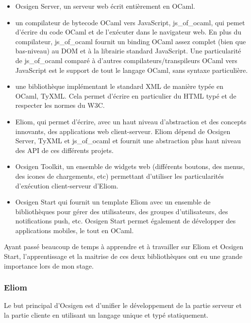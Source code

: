 \begin{itemize}
  \item Ocsigen Server\cite{ocsigen-server-github}, un serveur web écrit entièrement en OCaml.
  \item un compilateur de bytecode OCaml vers JavaScript, js\_of\_ocaml\cite{ocsigen-js-of-ocaml-github}, qui
    pemet d'écrire du code OCaml et de l'exécuter dans le navigateur web. En
plus du compilateur, js\_of\_ocaml fournit un binding OCaml assez complet (bien
que bas-niveau) au DOM et à la librairie standard JavaScript. Une particularité
de js\_of\_ocaml comparé à d'autres compilateurs/transpileurs OCaml vers
JavaScript est le support de tout le langage OCaml, sans syntaxe particulière.
  \item une bibliothèque implémentant le standard XML de manière typée en OCaml,
TyXML\cite{ocsigen-tyxml-github}. Cela permet d'écrire en particulier du HTML
typé et de respecter les normes du W3C.
  \item Eliom, qui permet d'écrire, avec un haut niveau
    d'abstraction et des concepts innovants, des applications web
client-serveur. Eliom dépend de Ocsigen Server, TyXML et js\_of\_ocaml et
fournit une abstraction plus haut niveau des API de ces différents projets.
  \item Ocsigen Toolkit, un ensemble de widgets web (différents boutons, des
    menus, des icones de chargements, etc) permettant d'utiliser les
    particularités d'exécution client-serveur d'Eliom.
  \item Ocsigen Start qui fournit un template Eliom avec un ensemble de
    bibliothèques pour gérer des utilisateurs, des groupes d'utilisateurs, des
    notifications push, etc. Ocsigen Start permet également de développer des
    applications mobiles, le tout en OCaml.
\end{itemize}

Ayant passé beaucoup de temps à apprendre et à travailler sur Eliom et Ocsigen
Start, l'apprentissage et la maitrise de ces deux bibliothèques ont eu une
grande importance lors de mon stage. 

\subsubsection{Eliom}

Le but principal d'Ocsigen est d'unifier le développement de la partie serveur
et la partie cliente en utilisant un langage unique et typé statiquement.

